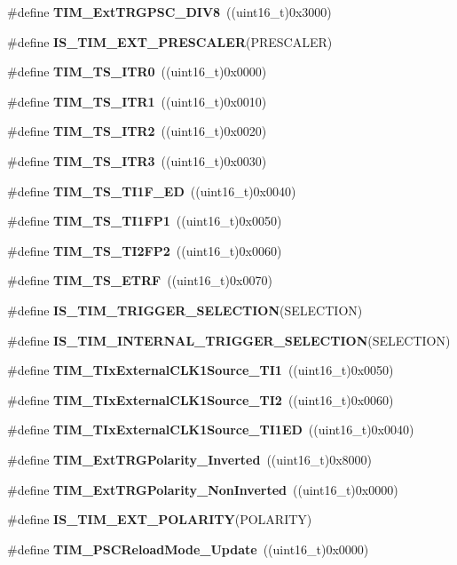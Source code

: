 \begin{DoxyCompactItemize}
\#define \textbf{ T\+I\+M\+\_\+\+Ext\+T\+R\+G\+P\+S\+C\+\_\+\+D\+I\+V8}~((uint16\+\_\+t)0x3000)
\item 
\#define \textbf{ I\+S\+\_\+\+T\+I\+M\+\_\+\+E\+X\+T\+\_\+\+P\+R\+E\+S\+C\+A\+L\+ER}(P\+R\+E\+S\+C\+A\+L\+ER)
\item 
\#define \textbf{ T\+I\+M\+\_\+\+T\+S\+\_\+\+I\+T\+R0}~((uint16\+\_\+t)0x0000)
\item 
\#define \textbf{ T\+I\+M\+\_\+\+T\+S\+\_\+\+I\+T\+R1}~((uint16\+\_\+t)0x0010)
\item 
\#define \textbf{ T\+I\+M\+\_\+\+T\+S\+\_\+\+I\+T\+R2}~((uint16\+\_\+t)0x0020)
\item 
\#define \textbf{ T\+I\+M\+\_\+\+T\+S\+\_\+\+I\+T\+R3}~((uint16\+\_\+t)0x0030)
\item 
\#define \textbf{ T\+I\+M\+\_\+\+T\+S\+\_\+\+T\+I1\+F\+\_\+\+ED}~((uint16\+\_\+t)0x0040)
\item 
\#define \textbf{ T\+I\+M\+\_\+\+T\+S\+\_\+\+T\+I1\+F\+P1}~((uint16\+\_\+t)0x0050)
\item 
\#define \textbf{ T\+I\+M\+\_\+\+T\+S\+\_\+\+T\+I2\+F\+P2}~((uint16\+\_\+t)0x0060)
\item 
\#define \textbf{ T\+I\+M\+\_\+\+T\+S\+\_\+\+E\+T\+RF}~((uint16\+\_\+t)0x0070)
\item 
\#define \textbf{ I\+S\+\_\+\+T\+I\+M\+\_\+\+T\+R\+I\+G\+G\+E\+R\+\_\+\+S\+E\+L\+E\+C\+T\+I\+ON}(S\+E\+L\+E\+C\+T\+I\+ON)
\item 
\#define \textbf{ I\+S\+\_\+\+T\+I\+M\+\_\+\+I\+N\+T\+E\+R\+N\+A\+L\+\_\+\+T\+R\+I\+G\+G\+E\+R\+\_\+\+S\+E\+L\+E\+C\+T\+I\+ON}(S\+E\+L\+E\+C\+T\+I\+ON)
\item 
\#define \textbf{ T\+I\+M\+\_\+\+T\+Ix\+External\+C\+L\+K1\+Source\+\_\+\+T\+I1}~((uint16\+\_\+t)0x0050)
\item 
\#define \textbf{ T\+I\+M\+\_\+\+T\+Ix\+External\+C\+L\+K1\+Source\+\_\+\+T\+I2}~((uint16\+\_\+t)0x0060)
\item 
\#define \textbf{ T\+I\+M\+\_\+\+T\+Ix\+External\+C\+L\+K1\+Source\+\_\+\+T\+I1\+ED}~((uint16\+\_\+t)0x0040)
\item 
\#define \textbf{ T\+I\+M\+\_\+\+Ext\+T\+R\+G\+Polarity\+\_\+\+Inverted}~((uint16\+\_\+t)0x8000)
\item 
\#define \textbf{ T\+I\+M\+\_\+\+Ext\+T\+R\+G\+Polarity\+\_\+\+Non\+Inverted}~((uint16\+\_\+t)0x0000)
\item 
\#define \textbf{ I\+S\+\_\+\+T\+I\+M\+\_\+\+E\+X\+T\+\_\+\+P\+O\+L\+A\+R\+I\+TY}(P\+O\+L\+A\+R\+I\+TY)
\item 
\#define \textbf{ T\+I\+M\+\_\+\+P\+S\+C\+Reload\+Mode\+\_\+\+Update}~((uint16\+\_\+t)0x0000)

\end{DoxyCompactItemize}
